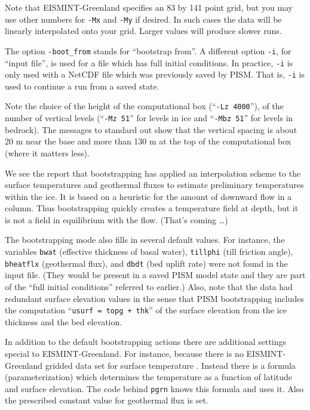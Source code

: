 \documentclass[11pt,final]{amsart}
\begin{document}
Note that EISMINT-Greenland specifies an 83 by 141 point grid, but you may use other numbers for \verb|-Mx| and \verb|-My| if desired.  In such cases the data will be linearly interpolated onto your grid.  Larger values will produce slower runs.

The option \verb|-boot_from| stands for ``bootstrap from''.  A different option \verb|-i|, for ``input file'', is used for a file which has full initial conditions.  In practice, \verb|-i| is only used with a NetCDF file which was previously saved by PISM.  That is, \verb|-i| is used to continue a run from a saved state.

Note the choice of the height of the computational box (``\verb|-Lz 4000|''), of the number of vertical levels (``\verb|-Mz 51|'' for levels in ice and ``\verb|-Mbz 51|'' for levels in bedrock). The messages to standard out show that the vertical spacing is about 20 m near the base and more than 130 m at the top of the computational box (where it matters less).

We see the report that bootstrapping has applied an interpolation scheme to the surface temperatures and geothermal fluxes to estimate preliminary temperatures within the ice.  It is based on a heuristic for the amount of downward flow in a column.  Thus bootstrapping quickly creates a temperature field at depth, but it is not a field in equilibrium with the flow.  (That's coming \dots)

The bootstrapping mode also fills in several default values.  For instance, the variables \verb|bwat| (effective thickness of basal water), \verb|tillphi| (till friction angle), \verb|bheatflx| (geothermal flux), and \verb|dbdt| (bed uplift rate) were not found in the input file.   (They would be present in a saved PISM model state and they are part of the ``full initial conditions'' referred to earlier.)  Also, note that the data had redundant surface elevation values in the sense that PISM bootstrapping includes the computation ``\verb|usurf = topg + thk|'' of the surface elevation from the ice thickness and the bed elevation.

In addition to the default bootstrapping actions there are additional settings special to EISMINT-Greenland.  For instance, because there is no EISMINT-Greenland gridded data set for surface temperature \cite{RitzEISMINT}.  Instead there is a formula (parameterization) which determines the temperature as a function of latitude and surface elevation.  The code behind \verb|pgrn| knows this formula and uses it.  Also the prescribed constant value for geothermal flux is set.
\end{document}
